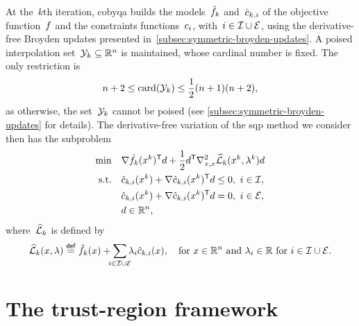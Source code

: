At the~$k$th iteration, \gls{cobyqa} builds the models~$\objm[k]$ and~$\conm[k]{i}$ of the objective function~$f$ and the constraints functions~$c_{i}$, with~$i \in \mathcal{I} \cup \mathcal{E}$, using the derivative-free Broyden updates presented in~\cref{subsec:symmetric-broyden-updates}.
A poised interpolation set~$\xpt[k] \subseteq \R^n$ is maintained, whose cardinal number is fixed.
The only restriction is
\begin{equation*}
    n + 2 \le \card(\xpt[k]) \le \frac{1}{2} (n + 1) (n + 2),
\end{equation*}
as otherwise, the set~$\xpt[k]$ cannot be poised (see \cref{subsec:symmetric-broyden-updates} for details).
The derivative-free variation of the \gls{sqp} method we consider then has the subproblem
\begin{align*}
    \min        & \quad \nabla \objm[k](x^k)^{\T} d + \frac{1}{2} d^{\T} \nabla_{x, x}^2 \lagm[k](x^k, \lambda^k) d \label{eq:sqp-subproblem-obj}\\
    \text{s.t.} & \quad \conm[k]{i}(x^k) + \nabla \conm[k]{i}(x^k)^{\T} d \le 0, ~ i \in \iub,\\
                & \quad \conm[k]{i}(x^k) + \nabla \conm[k]{i}(x^k)^{\T} d = 0, ~ i \in \ieq,\\
                & \quad d \in \R^n,
\end{align*}
where~$\lagm[k]$ is defined by
\begin{equation*}
    \lagm[k](x, \lambda) \eqdef \objm[k](x) + \sum_{\mathclap{i \in \iub \cup \ieq}} \lambda_i \conm[k]{i}(x), \quad \text{for~$x \in \R^n$ and~$\lambda_i \in \R$ for~$i \in \iub \cup \ieq$}.
\end{equation*}

\section{The trust-region framework}


